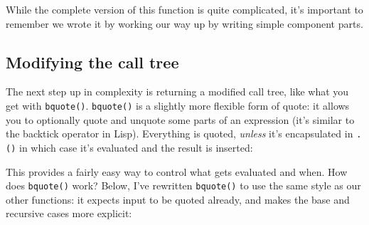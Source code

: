 While the complete version of this function is quite complicated, it's
important to remember we wrote it by working our way up by writing
simple component parts.

\subsection{Modifying the call tree}\label{modifying-code}

The next step up in complexity is returning a modified call tree, like
what you get with \texttt{bquote()}. \texttt{bquote()} is a slightly
more flexible form of quote: it allows you to optionally quote and
unquote some parts of an expression (it's similar to the backtick
operator in Lisp). Everything is quoted, \emph{unless} it's encapsulated
in \texttt{.()} in which case it's evaluated and the result is inserted:

\begin{Shaded}
\begin{Highlighting}[]
\StringTok{ }
\StringTok{ }
\StringTok{ }
\StringTok{ }
\StringTok{ }
\StringTok{ }
\end{Highlighting}
\end{Shaded}

This provides a fairly easy way to control what gets evaluated and when.
How does \texttt{bquote()} work? Below, I've rewritten \texttt{bquote()}
to use the same style as our other functions: it expects input to be
quoted already, and makes the base and recursive cases more explicit:

